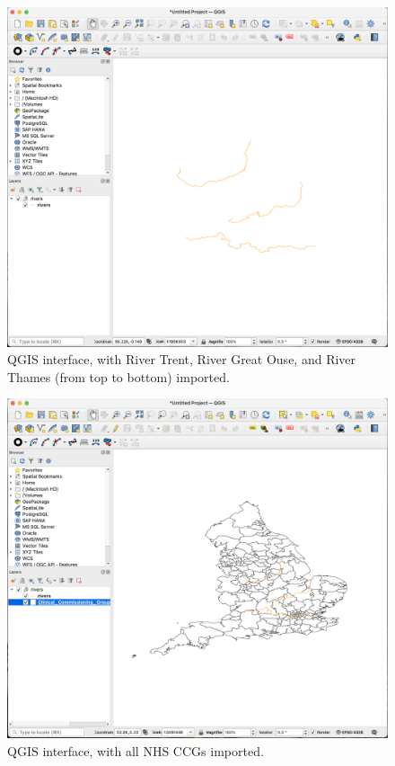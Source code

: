 {
    \begin{figure}[tbh!]
        \centering
        \includegraphics[width=\columnwidth]{figure/qgis/import_rivers.png}
        \caption{QGIS interface, with River Trent, River Great Ouse, and River Thames (from top to bottom) imported.}
        \label{fig:import_rivers}
    \end{figure}

    \begin{figure}[tbh!]
        \centering
        \includegraphics[width=\columnwidth]{figure/qgis/import_ccgs.png}
        \caption{QGIS interface, with all NHS CCGs imported.}
        \label{fig:import_ccgs}
    \end{figure}

}
